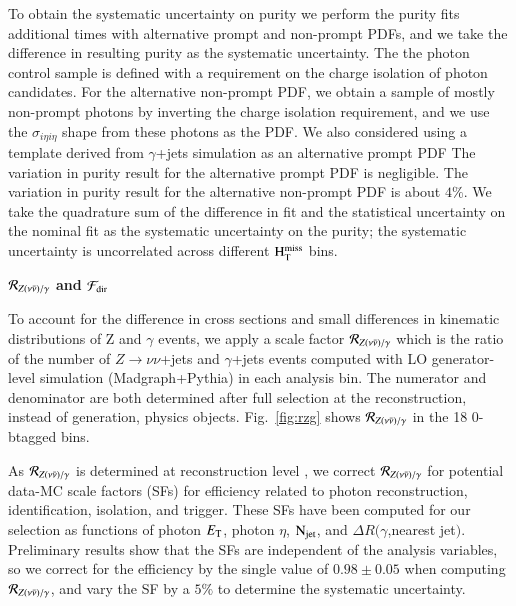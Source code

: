 To obtain the systematic uncertainty on purity we perform the purity fits additional times with alternative prompt and 
non-prompt PDFs, and we take the difference in resulting purity as the systematic uncertainty.  The %
the photon control sample is defined with a requirement on the charge isolation of photon candidates.
For the alternative non-prompt PDF, we obtain a sample of mostly non-prompt photons by inverting 
the charge isolation requirement, and we use the $\sigma_{i\eta i\eta}$ shape from these photons as the PDF.
We also considered using a template derived from $\gamma$+jets simulation as an alternative prompt PDF
The variation in purity result for the alternative prompt PDF is negligible.  
The variation in purity result for the alternative non-prompt PDF is about $4\%$.
We take the quadrature sum of the difference in fit and the statistical uncertainty on the nominal fit as the systematic 
uncertainty on the purity; the systematic uncertainty is uncorrelated across different $\rm H_{T}^{miss}$ bins.



{\bf ${\cal R}_{Z(\nu\bar{\nu})/\gamma}$ and ${\cal F}_{\rm dir}$}

To account for the difference in cross sections and small differences 
in kinematic distributions of Z and $\gamma$ events, we apply a scale 
factor ${\cal R}_{Z(\nu\bar{\nu})/\gamma}$ which is the ratio of the 
number of $Z\to\nu\nu$+jets and $\gamma$+jets events computed with 
LO generator-level simulation ({\sc Madgraph}+{\sc Pythia}) 
in each analysis bin.  The numerator and denominator are both determined 
after full selection at the reconstruction, instead of generation, physics 
objects. Fig.~\ref{fig:rzg} shows ${\cal R}_{Z(\nu\bar{\nu})/\gamma}$ in the 18 0-btagged bins. 


As ${\cal R}_{Z(\nu\bar{\nu})/\gamma}$ is determined at reconstruction level , we correct ${\cal R}_{Z(\nu\bar{\nu})/\gamma}$ for potential data-MC scale factors (SFs)  for efficiency related to photon reconstruction,  identification, isolation, and trigger.  
These SFs have been computed for our selection as functions of photon $E_{\rm T}$, photon 
$\eta$, $\rm N_{jet}$, and $\Delta R(\gamma$,nearest jet$)$.  Preliminary results show that 
the SFs are independent of the analysis variables, so we correct for the efficiency by the 
single value of $0.98\pm0.05$ when computing ${\cal R}_{Z(\nu\bar{\nu})/\gamma}$, and  
vary the SF by a $5\%$ to determine the systematic uncertainty.

